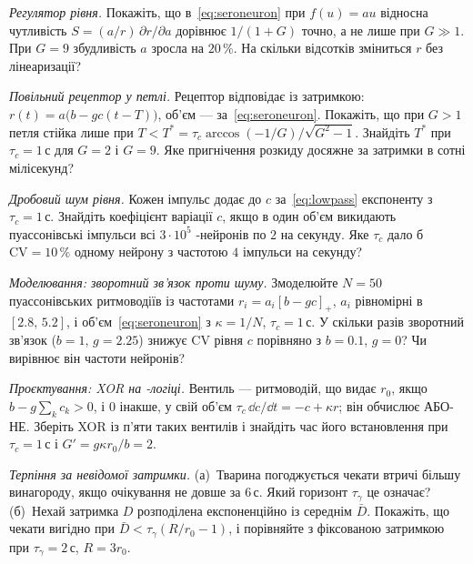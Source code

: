 \begin{exercise}[\lvlA]
\label{ex:05:2}
\emph{Регулятор рівня.} Покажіть, що в~\eqref{eq:seroneuron} при $f(u)=au$ відносна чутливість $S=(a/r)\,\partial r/\partial a$ дорівнює $1/(1+G)$ точно, а не лише при $G\gg1$. При $G=9$ збудливість $a$ зросла на $20\,\%$. На скільки відсотків зміниться $r$ без лінеаризації?
\end{exercise}

\begin{exercise}[\lvlB]
\label{ex:05:3}
\emph{Повільний рецептор у петлі.} Рецептор  відповідає із затримкою: $r(t)=a\bigl(b-gc(t-T)\bigr)$, об'єм --- за~\eqref{eq:seroneuron}. Покажіть, що при $G>1$ петля стійка лише при $T<T^*=\tau_c\arccos(-1/G)/\sqrt{G^2-1}$. Знайдіть $T^*$ при $\tau_c=1\,\text{с}$ для $G=2$ і $G=9$. Яке пригнічення розкиду досяжне за затримки в сотні мілісекунд?
\end{exercise}

\begin{exercise}[\lvlB]
\label{ex:05:4}
\emph{Дробовий шум рівня.} Кожен імпульс додає до $c$ за~\eqref{eq:lowpass} експоненту з $\tau_c=1\,\text{с}$. Знайдіть коефіцієнт варіації $c$, якщо в один об'єм викидають пуассонівські імпульси всі $3\cdot10^5$ -нейронів по $2$ на секунду. Яке $\tau_c$ дало б $\mathrm{CV}=10\,\%$ одному нейрону з частотою $4$ імпульси на секунду?
\end{exercise}

\begin{exercise}[\lvlB]
\label{ex:05:5}
\emph{Моделювання: зворотний зв'язок проти шуму.} Змоделюйте $N=50$ пуассонівських ритмоводіїв із частотами $r_i=a_i[b-gc]_+$, $a_i$ рівномірні в $[2.8,\,5.2]$, і об'єм~\eqref{eq:seroneuron} з $\kappa=1/N$, $\tau_c=1\,\text{с}$. У скільки разів зворотний зв'язок ($b=1$, $g=2.25$) знижує CV рівня $c$ порівняно з $b=0.1$, $g=0$? Чи вирівнює він частоти нейронів?
\end{exercise}

\begin{exercise}[\lvlB]
\label{ex:05:6}
\emph{Проєктування: XOR на -логіці.} Вентиль --- ритмоводій, що видає $r_0$, якщо $b-g\sum_kc_k>0$, і $0$ інакше, у свій об'єм $\tau_c\,\dd c/\dd t=-c+\kappa r$; він обчислює АБО-НЕ. Зберіть XOR із п'яти таких вентилів і знайдіть час його встановлення при $\tau_c=1\,\text{с}$ і $G'=g\kappa r_0/b=2$.
\end{exercise}

\begin{exercise}[\lvlB]
\label{ex:05:7}
\emph{Терпіння за невідомої затримки.} (а)~Тварина погоджується чекати втричі більшу винагороду, якщо очікування не довше за $6\,\text{с}$. Який горизонт $\tau_\gamma$ це означає? (б)~Нехай затримка $D$ розподілена експоненційно із середнім $\bar D$. Покажіть, що чекати вигідно при $\bar D<\tau_\gamma(R/r_0-1)$, і порівняйте з фіксованою затримкою при $\tau_\gamma=2\,\text{с}$, $R=3r_0$.
\end{exercise}

